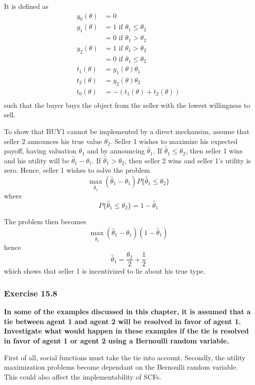 \documentclass[12pt, a4paper]{article}
\begin{document}
It is defined as
\begin{align*}
	y_0(\theta) &= 0 \\
	y_1(\theta) &= 1 \text{ if } \theta_1 \leq \theta_2 \\
				&= 0 \text{ if } \theta_1 > \theta_2 \\
	y_2(\theta) &= 1 \text{ if } \theta_1 > \theta_2 \\
				&= 0 \text{ if } \theta_1 \leq \theta_2 \\
	t_1(\theta) &= y_1(\theta)\theta_1 \\
	t_2(\theta) &= y_2(\theta)\theta_2 \\
	t_0(\theta) &= -(t_1(\theta) + t_2(\theta)) \\
\end{align*}
such that the buyer buys the object from the seller with the lowest willingness to sell.

To show that BUY1 cannot be implemented by a direct mechansim, assume that seller 2 announces his true value $\theta_2$. Seller 1 wishes to maximize his expected payoff, having valuation $\theta_1$ and by announcing $\hat{\theta}_1$. If $\hat{\theta}_1 \leq \theta_2$, then seller 1 wins and his utility will be $\hat{\theta}_1 - \theta_1$. If $\hat{\theta}_1 > \theta_2$, then seller 2 wins and seller 1's utility is zero. Hence, seller 1 wishes to solve the problem
\[ \max_{\hat{\theta}_1}(\hat{\theta}_1 - \theta_1)P\{\hat{\theta}_1 \leq \theta_2\} \]
where
\[ P\{\hat{\theta}_1 \leq \theta_2\} = 1-\hat{\theta}_1 \]

The problem then becomes
\[ \max_{\hat{\theta}_1}(\hat{\theta}_1 - \theta_1)(1-\hat{\theta}_1) \]
hence
\[ \hat{\theta}_1 = \frac{\theta_2}{2} + \frac{1}{2} \]
which shows that seller 1 is incentivized to lie about his true type.

\subsubsection*{Exercise 15.8}

\textbf{In some of the examples discussed in this chapter, it is assumed that a tie between agent 1 and agent 2 will be resolved in favor of agent 1. Investigate what would happen in these examples if the tie is resolved in favor of agent 1 or agent 2 using a Bernoulli random variable.}

First of all, social functions must take the tie into account. Secondly, the utility maximization problems become dependant on the Bernoulli random variable. This could also affect the implementability of SCFs.
\end{document}
